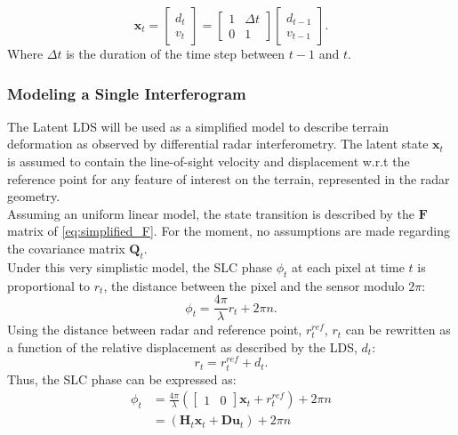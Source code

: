 \documentclass{article}
\begin{document}
\begin{equation}\label{eq:simplified_F}
	\mathbf{x}_t = 
		\begin{bmatrix}
			d_{t}\\
			v_{t}
		\end{bmatrix} =
		\begin{bmatrix}
		1 & \Delta t\\
		0 & 1
		\end{bmatrix}
		\begin{bmatrix}
			d_{t-1}\\
			v_{t-1}
		\end{bmatrix}.
\end{equation}
Where $\Delta t$ is the duration of the time step between $t-1$ and $t$.\\
\subsubsection{Modeling a Single Interferogram}
The Latent LDS will be used as a simplified model to describe terrain deformation as observed by differential radar interferometry. The latent state $\mathbf{x}_t$ is assumed to contain the line-of-sight velocity and displacement w.r.t  the reference point for any feature of interest on the terrain, represented in the radar geometry.\\ Assuming an uniform linear model, the state transition is described by the $\mathbf{F}$ matrix of \autoref{eq:simplified_F}. For the moment, no assumptions are made regarding the covariance matrix $\mathbf{Q}_t$.\\
Under this very simplistic model, the SLC phase $\phi_t$ at each pixel at time $t$ is proportional to $r_t$, the distance between the pixel and the sensor modulo $2 \pi$:
\begin{equation}
	\phi_t = \frac{4\pi}{\lambda} r_t + 2 \pi n.
\end{equation}
Using the distance between radar and reference point, $r_t^{ref}$, $r_t$ can be rewritten as a function of the relative displacement as described by the LDS, $d_t$:
\begin{equation}
	r_t = r_t^{ref} + d_t.
\end{equation}
Thus, the SLC phase can be expressed as:
\begin{equation}
	\begin{aligned}
	\phi_t  &= \frac{4\pi}{\lambda} \left(
		\begin{bmatrix}
			1 & 0
		\end{bmatrix} \mathbf{x}_{t}
		+  r_t^{ref}
		\right) + 2 \pi n\\
		 &= \left(\mathbf{H}_{t}\mathbf{x}_t + \mathbf{D}\mathbf{u}_t\right) + 2 \pi n
	\end{aligned}		
\end{equation}
\end{document}
